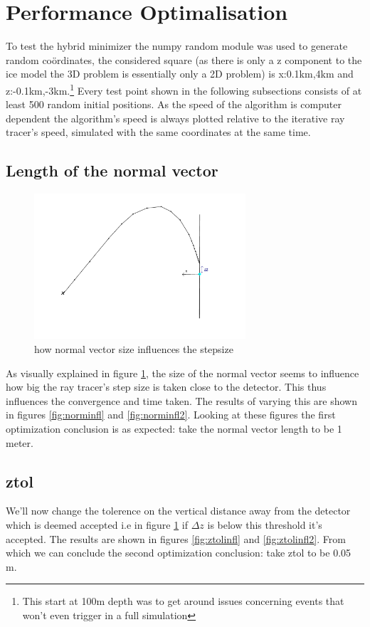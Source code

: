 \documentclass[11pt,a4paper,faculty=we,language=en,doctype=report]{cls/ugent-doc}
\begin{document}
\section{Performance Optimalisation}
To test the hybrid minimizer the numpy random module was used to generate
random coördinates, the considered square (as there is only a z component to the
ice model the 3D problem is essentially only a 2D problem) is x:0.1km,4km and
z:-0.1km,-3km.\footnote{This start at 100m depth was to get around issues concerning events that 
won't even trigger in a full simulation}
Every test point shown in the following subsections consists of at least 500 random initial positions.
As the speed of the algorithm is computer dependent the algorithm's speed is always plotted relative to
the iterative ray tracer's speed, simulated with the same coordinates at the same time.
\subsection{Length of the normal vector}
\begin{figure}[h!]
	\centering
	\includegraphics[width=0.7\textwidth]{figures/PrincipleNormIllu.pdf}
	\caption{how normal vector size influences the stepsize}
	\label{fig:normexpl}
\end{figure}
As visually explained in figure \ref{fig:normexpl}, the size of the normal vector seems to
influence how big the ray tracer's step size is taken close to the detector. This
thus influences the convergence and time taken. The results of varying this are shown
in figures \ref{fig:norminfl} and \ref{fig:norminfl2}.
Looking at these figures the first optimization conclusion is as expected: 
take the normal vector length to be 1 meter.
\subsection{ztol}
We'll now change the tolerence on the vertical distance away from the detector which is deemed
accepted i.e in figure \ref{fig:normexpl} if $\Delta z$ is below this threshold it's accepted.
The results are shown in figures \ref{fig:ztolinfl} and \ref{fig:ztolinfl2}.
From which we can conclude the second optimization conclusion: take ztol to be 0.05 m.
\end{document}
